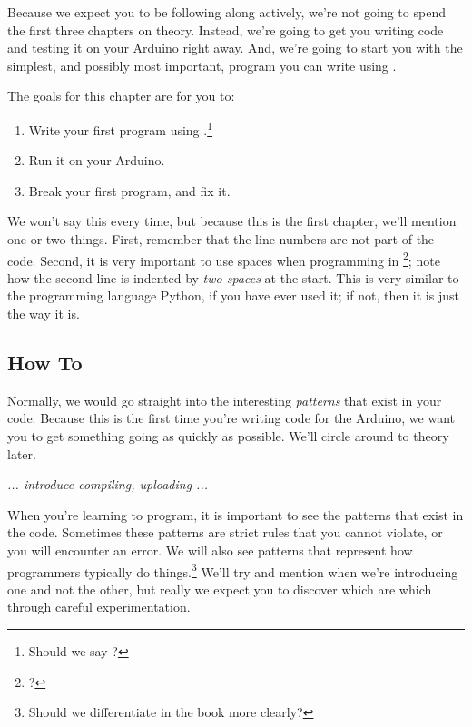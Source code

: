 
Because we expect you to be following along actively, we're not going to spend the first three chapters on theory. Instead, we're going to get you writing code and testing it on your Arduino right away. And, we're going to start you with the simplest, and possibly most important, program you can write using \plumbing.

\GOALS
The goals for this chapter are for you to:

\begin{enumerate}
	\item Write your first program using \plumbing.\footnote{Should we say \occam?}
	\item Run it on your Arduino.
	\item Break your first program, and fix it.
\end{enumerate}

\CODE


We won't say this every time, but because this is the first chapter, we'll mention one or two things. First, remember that the {\strong line numbers are not part of the code}. Second, it is very important to use spaces when programming in \occam\footnote{\plumbing?}; note how the second line is indented by {\em two spaces} at the start. This is very similar to the programming language Python, if you have ever used it; if not, then it is just the way it is.

\subsection{How To}
Normally, we would go straight into the interesting {\em patterns} that exist in your code. Because this is the first time you're writing \plumbing code for the Arduino, we want you to get something going as quickly as possible. We'll circle around to theory later.

{\em ... introduce compiling, uploading ...}

\PATTERNS
When you're learning to program, it is important to see the patterns that exist in the code. Sometimes these patterns are strict rules that you cannot violate, or you will encounter an error. We will also see patterns that represent how programmers typically do things.\footnote{Should we differentiate in the book more clearly?} We'll try and mention when we're introducing one and not the other, but really we expect you to discover which are which through careful experimentation.

